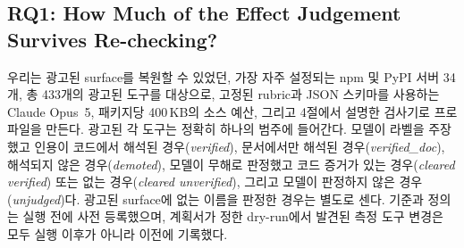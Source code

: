 \documentclass[acmsmall,screen,review,anonymous]{acmart}
\begin{document}
\subsection{RQ1: How Much of the Effect Judgement Survives Re-checking?}
\label{sec:rq1}

우리는 광고된 surface를 복원할 수 있었던, 가장 자주 설정되는 npm 및 PyPI 서버 34개, 총 433개의 광고된 도구를 대상으로, 고정된 rubric과 JSON 스키마를 사용하는 Claude Opus~5, 패키지당 400\,KB의 소스 예산, 그리고 4절에서 설명한 검사기로 프로파일을 만든다. 광고된 각 도구는 정확히 하나의 범주에 들어간다. 모델이 라벨을 주장했고 인용이 코드에서 해석된 경우(\emph{verified}), 문서에서만 해석된 경우(\emph{verified\_doc}), 해석되지 않은 경우(\emph{demoted}), 모델이 무해로 판정했고 코드 증거가 있는 경우(\emph{cleared verified}) 또는 없는 경우(\emph{cleared unverified}), 그리고 모델이 판정하지 않은 경우(\emph{unjudged})다. 광고된 surface에 없는 이름을 판정한 경우는 별도로 센다. 기준과 정의는 실행 전에 사전 등록했으며, 계획서가 정한 dry-run에서 발견된 측정 도구 변경은 모두 실행 이후가 아니라 이전에 기록했다.
\end{document}
